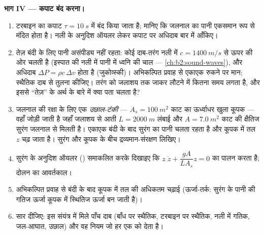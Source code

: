 \begin{problem}
\medskip
\noindent\textbf{भाग IV --- कपाट बंद करना।}
\begin{enumerate}[resume]
  \item टरबाइन का कपाट $\tau = \qty{10}{s}$ में बंद किया जाता है; मानिए कि
        जलनाल का पानी एकसमान रूप से मंदित होता है। नली के अनुदिश
        ऑयलर लेकर कपाट पर अधिदाब बार में आँकिए।
  \item तेज़ बंदी के लिए पानी असंपीड्य नहीं रहता: कोई दाब-तरंग
        नली में $c = \qty{1400}{m/s}$ से ऊपर की ओर चलती है (इस्पात की नली
        में पानी में ध्वनि की चाल --- \cref{ch:b2:sound-waves}),
        और अधिदाब $\Delta P = \rho c\,\Delta v$ होता है (जुकोव्स्की)।
        अभिकल्पित प्रवाह से एकाएक रुकने पर मान; स्थैतिक दाब से
        तुलना कीजिए। तरंग को जलाशय तक जाकर लौटने में कितना समय
        लगता है, और इससे ``तेज़'' के अर्थ के बारे में क्या
        पता चलता है?
  \item जलनाल की रक्षा के लिए एक \emph{उछाल-टंकी} --- $A_s = \qty{100}{m^2}$
        काट का ऊर्ध्वाधर खुला कूपक --- वहाँ जोड़ी जाती है जहाँ जलाशय से
        आती $L = \qty{2000}{m}$ लंबाई और $A =
        \qty{7.0}{m^2}$ काट की क्षैतिज सुरंग जलनाल से मिलती है। एकाएक
        बंदी के बाद सुरंग का पानी चलता रहता है और कूपक में
        तल $z$ चढ़ जाता है। सुरंग और कूपक के बीच द्रव्यमान-संरक्षण
        लिखिए।
  \item सुरंग के अनुदिश ऑयलर () समाकलित करके दिखाइए कि
        $z$ $\ddot z + \dfrac{gA}{LA_s}z = 0$ का पालन करता है; दोलन का
        आवर्तकाल।
  \item अभिकल्पित प्रवाह से बंदी के बाद कूपक में तल की अधिकतम चढ़ाई
        (ऊर्जा-तर्क: सुरंग के पानी की गतिज ऊर्जा कूपक में
        स्थितिज ऊर्जा बन जाती है)।
  \item सार दीजिए: इस संयंत्र में मिले पाँच दाब (बाँध पर स्थैतिक,
        टरबाइन पर स्थैतिक, नली में गतिक, जल-आघात,
        उछाल) और वह नियम जो हर एक को देता है।
\end{enumerate}
\end{problem}
